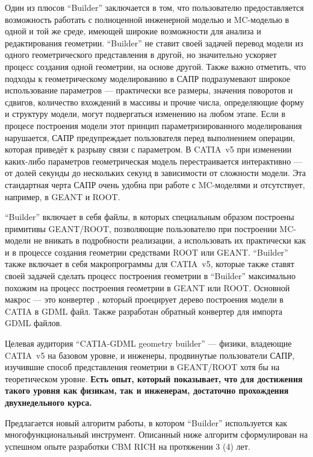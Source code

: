 Один из плюсов ``Builder'' заключается в том, что пользователю предоставляется возможность работать с полноценной инженерной моделью и MC-моделью в одной и той же среде, имеющей широкие возможности для анализа и редактирования геометрии. ``Builder'' не ставит своей задачей перевод модели из одного геометрического представления в другой, но значительно ускоряет процесс создания одной геометрии, на основе другой. Также важно отметить, что подходы к геометрическому моделированию в САПР подразумевают широкое использование параметров --- практически все размеры, значения поворотов и сдвигов, количество вхождений в массивы и прочие числа, определяющие форму и структуру модели, могут подвергаться изменению на любом этапе. Если в процесе построения модели этот принцип параметризированного моделирования нарушается, САПР предупреждает пользователя перед выполнением операции, которая приведёт к разрыву связи с параметром. В CATIA~v5 при изменении каких-либо параметров геометрическая модель перестраивается интерактивно --- от долей секунды до нескольких секунд в зависимости от сложности модели.  Эта стандартная черта САПР очень удобна при работе с MC-моделями и отсутствует, например, в GEANT и ROOT.

``Builder'' включает в себя файлы, в которых специальным образом построены примитивы GEANT/ROOT, позволяющие пользователю при построении MC-модели не вникать в подробности реализации, а использовать их практически как и в процессе создания геометрии средствами ROOT или GEANT. ``Builder'' также включает в себя макропрограммы для CATIA~v5, которые также ставят своей задачей сделать процесс построения геометрии в ``Builder'' максимально похожим на процесс построения геометрии в GEANT или ROOT. Основной макрос --- это конвертер , который проецирует дерево построения модели в CATIA в GDML файл. Также разработан обратный конвертер  для импорта GDML файлов.

Целевая аудитория ``CATIA-GDML geometry builder'' --- физики, владеющие CATIA~v5 на базовом уровне, и инженеры, продвинутые пользователи САПР, изучившие способ представления геометрии в GEANT/ROOT хотя бы на теоретическом уровне. \textbf{Есть опыт, который показывает, что для достижения такого уровня как физикам, так и инженерам, достаточно прохождения двухнедельного курса.}

Предлагается новый алгоритм работы, в котором ``Builder'' используется как многофункциональный инструмент. Описанный ниже алгоритм сформулирован на успешном опыте разработки CBM RICH на протяжении 3 (4) лет.

